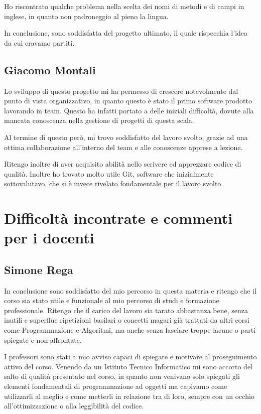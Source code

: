 \documentclass[a4paper,12pt]{report}
\begin{document}
Ho riscontrato qualche problema nella scelta dei nomi di metodi e di campi in inglese, in quanto non padroneggio al pieno la lingua.

In conclusione, sono soddisfatta del progetto ultimato, il quale rispecchia l’idea da cui eravamo partiti.

\subsection{Giacomo Montali}

Lo sviluppo di questo progetto mi ha permesso di crescere notevolmente dal punto di vista organizzativo, in quanto questo è stato il primo software prodotto lavorando in team. Questo ha infatti portato a delle iniziali difficoltà, dovute alla mancata conoscenza nella gestione di progetti di questa scala. 

Al termine di questo però, mi trovo soddisfatto del lavoro svolto, grazie ad una ottima collaborazione all’interno del team e alle conoscenze apprese a lezione.

Ritengo inoltre di aver acquisito abilità nello scrivere ed apprezzare codice di qualità.
Inoltre ho trovato molto utile Git, software che inizialmente sottovalutavo, che si è invece rivelato fondamentale per il lavoro svolto.


\section{Difficoltà incontrate e commenti per i docenti}

\subsection{Simone Rega}
In conclusione sono soddisfatto del mio percorso in questa materia e ritengo che il corso sia stato utile e funzionale al mio percorso di studi e formazione professionale. Ritengo che il carico del lavoro sia tarato abbastanza bene, senza inutili e superflue ripetizioni basilari o concetti magari già trattati da altri corsi come Programmazione e Algoritmi, ma anche senza lasciare troppe lacune o parti spiegate e non affrontate. 

I professori sono stati a mio avviso capaci di spiegare e motivare al proseguimento attivo del corso.
Venendo da un Istituto Tecnico Informatico mi sono accorto del salto di qualità presentato nel corso, in quanto non venivano solo spiegati gli elementi fondamentali di programmazione ad oggetti ma capivamo come utilizzarli al meglio e come metterli in relazione tra di loro, sempre con un occhio all'ottimizzazione o alla leggibilità del codice.
\end{document}
